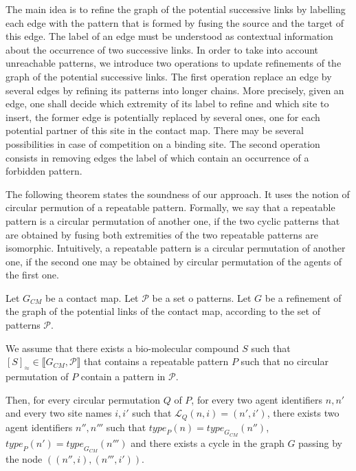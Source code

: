\documentclass{entcs}
\newcommand{\graphsymb}{G}
\newcommand{\iso}{\approx}
\newcommand{\type}[1][\graphsymb]{\textit{type}_{#1}}
\newcommand{\links}[1][\graphsymb]{\mathcal{L}_{#1}}
\begin{document}
The main idea is to refine the graph of the potential successive links by labelling each edge with the pattern that is formed by fusing the source and the target of this edge. The label of an edge must be understood as contextual information about the occurrence of two successive links. In order to take into account unreachable patterns, we introduce two operations to update refinements of the graph of the potential successive links. The first operation replace
an edge by several edges by refining its patterns into longer chains.
More precisely, given an edge, one shall decide which extremity of its label to refine and which site to insert, the former edge is potentially replaced by several ones, one for each potential partner of this site in the contact map. There may be several possibilities in case of competition on a binding site. The second operation consists in removing edges the label of which contain an occurrence of a forbidden pattern.

The following theorem states the soundness of our approach.
It uses the notion of circular permution of a repeatable pattern.
Formally, we say that a repeatable pattern is a circular permutation of another one, if the two cyclic patterns that are obtained by fusing both extremities of the two repeatable patterns are isomorphic. Intuitively, a repeatable pattern is a circular permutation of another one, if the second one may be obtained by circular permutation of the agents of the first one.

\begin{theorem}
  \label{th:linkbis}
  Let $\graphsymb_{\textit{CM}}$ be a contact map.
  Let $\mathcal{P}$ be a set o patterns.
  Let $G$ be a refinement of the graph of the potential links of the contact map, according to the set of patterns $\mathcal{P}$.

  We assume that there exists a bio-molecular compound $S$ such that $[S]_{\iso} \in \llbracket \graphsymb_{\textit{CM}}, \mathcal{P}\rrbracket$ that contains a repeatable pattern $P$ such that no circular permutation of $P$ contain a pattern in $\mathcal{P}$.

  Then, for every circular permutation $Q$ of $P$, for every two agent identifiers $n,n'$ and every two site names $i,i'$ such that $\links[Q](n,i)=(n',i')$, there exists two agent identifiers $n'',n'''$ such that $\type[P](n)=\type[\graphsymb_{\textit{CM}}](n'')$,
  $\type[P](n')=\type[\graphsymb_{\textit{CM}}](n''')$ and
  there exists a cycle in the graph $G$ passing by  the node $((n'',i),(n''',i'))$.
\end{theorem}
\end{document}
